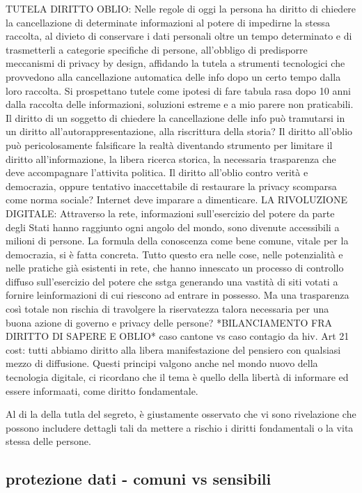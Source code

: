 TUTELA DIRITTO OBLIO:
Nelle regole di oggi la persona ha diritto di chiedere la cancellazione di determinate informazioni al potere di impedirne la stessa raccolta, al divieto di conservare i dati personali oltre un tempo determinato e di trasmetterli a categorie specifiche di persone, all’obbligo di predisporre meccanismi di privacy by design, affidando la tutela a strumenti tecnologici che provvedono alla cancellazione automatica delle info dopo un certo tempo dalla loro raccolta.
Si prospettano tutele come ipotesi di fare tabula rasa dopo 10 anni dalla raccolta delle informazioni, soluzioni estreme e a mio parere non praticabili.
Il diritto di un soggetto di chiedere la cancellazione delle info può tramutarsi in un diritto all’autorappresentazione, alla riscrittura della storia? Il diritto all’oblio può pericolosamente falsificare la realtà diventando strumento per limitare il diritto all’informazione, la libera ricerca storica, la necessaria trasparenza che deve accompagnare l’attivita politica.
Il diritto all’oblio contro verità e democrazia, oppure tentativo inaccettabile di restaurare la privacy scomparsa come norma sociale? Internet deve imparare a dimenticare.
LA RIVOLUZIONE DIGITALE:
Attraverso la rete, informazioni sull’esercizio del potere da parte degli Stati hanno raggiunto ogni angolo  del mondo, sono divenute accessibili a milioni di persone. La formula della conoscenza come bene comune, vitale per la democrazia, si è fatta concreta. Tutto questo era nelle cose, nelle potenzialità e nelle pratiche già esistenti in rete, che hanno innescato un processo di controllo diffuso sull’esercizio del potere che sstga generando una vastità di siti votati a fornire leinformazioni di cui riescono ad entrare in possesso. Ma una trasparenza così totale non rischia di travolgere la riservatezza talora necessaria per una buona azione di governo e privacy delle persone?
*BILANCIAMENTO FRA DIRITTO DI SAPERE E OBLIO* caso cantone vs caso contagio da hiv.
Art 21 cost: tutti abbiamo diritto alla libera manifestazione del pensiero con qualsiasi mezzo di diffusione. Questi principi valgono anche nel mondo nuovo della tecnologia digitale, ci ricordano che il tema è quello della libertà di informare ed essere informaati, come diritto fondamentale.

Al di la della tutla del segreto, è giustamente osservato che vi sono rivelazione che  possono includere dettagli tali da mettere a rischio i diritti fondamentali o la vita stessa delle persone. 
\subsection{protezione dati -  comuni vs sensibili}
